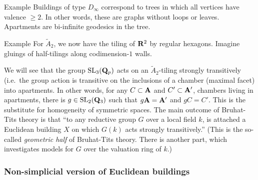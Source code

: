 \begin{enonce}{Example}
Buildings of type $D_\infty$ correspond to trees in which all vertices have
valence $\geqslant 2$. In other words, these are graphs without loops or 
leaves. Apartments are bi-infinite geodesics in the tree. 
\end{enonce}

\begin{enonce}{Example}
For $\widetilde A_2$, we now have the tiling of $\mathbf{R}^2$ by regular hexagons. 
Imagine gluings of half-tilings along codimension-$1$ walls. 
\end{enonce}

We will see that the group $\operatorname{SL}_3(\mathbf{Q}_p)$ acts on an 
$\widetilde A_2$-tiling strongly transitively (i.e.\ the group action is 
transitive on the inclusions of a chamber (maximal facet) into 
apartments. In other words, for any $C\subset\mathbf{A}$ and $C'\subset \mathbf{A}'$, 
chambers living in apartments, there is $g\in \operatorname{SL}_2(\mathbf{Q}_3)$ such 
that $g \mathbf{A}=\mathbf{A}'$ and $g C=C'$. This is the substitute for homogeneity of 
symmetric spaces. The main outcome of Bruhat-Tits theory is that ``to any 
reductive group $G$ over a local field $k$, is attached a Euclidean building 
$X$ on which $G(k)$ acts strongly transitively.'' (This is the so-called 
\emph{geometric half} of Bruhat-Tits theory. There is another part, which 
investigates models for $G$ over the valuation ring of $k$.) 


\subsubsection{Non-simplicial version of Euclidean buildings}

